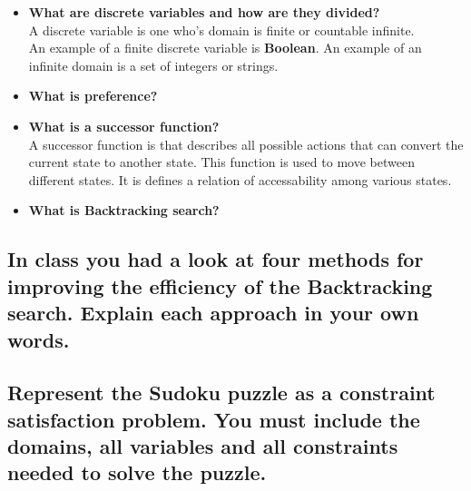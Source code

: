\documentclass[11pt]{article}
\begin{document}
\begin{itemize}
		\item\textbf{What are discrete variables and how are they divided?}\\
		A discrete variable is one who's domain is finite or countable infinite.\\ An example of a finite discrete variable is \textbf{Boolean}. An example of an infinite domain is a set of integers or strings.
		
		\item\textbf{What is preference?}\\
		
		\item\textbf{What is a successor function?}\\
		A successor function is that describes all possible actions that can convert the current state to another state. This function is used to move between different states. It is defines a relation of accessability among various states. 
		
		\item\textbf{What is Backtracking search?}\\
	\end{itemize}

\newpage
\subsection{In class you had a look at four methods for improving the efficiency of
the Backtracking search. Explain each approach in your own words.}

\newpage
\subsection{Represent the Sudoku puzzle as a constraint satisfaction problem. You
must include the domains, all variables and all constraints needed to
solve the puzzle.}
\end{document}
